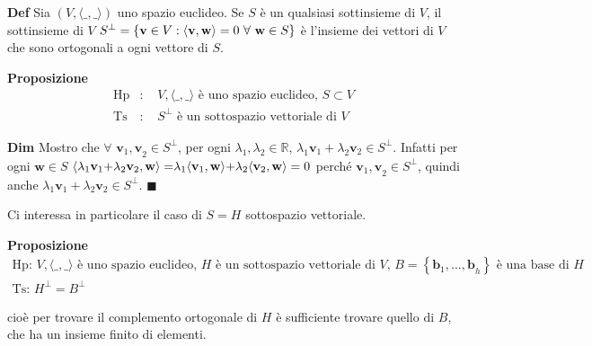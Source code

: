 \documentclass{article}
\begin{document}
\textbf{Def} Sia $\left( V,\langle \_,\_\mathbf{\rangle }\right) $ uno
spazio euclideo. Se $S$ \`{e} un qualsiasi sottinsieme di $V$, il
sottinsieme di $V$ $S^{\perp }=\left\{ \mathbf{v}\in V:\langle \mathbf{%
v,w\rangle }=0\text{ }\forall \text{ }\mathbf{w}\in S\right\} $ \`{e}
l'insieme dei vettori di $V$ che sono ortogonali a ogni vettore di $S$.

\textbf{Proposizione}%
\begin{eqnarray*}
\text{Hp} &\text{: }&V,\langle \_,\_\mathbf{\rangle }\text{ \`{e} uno spazio
euclideo, }S\subset V \\
\text{Ts} &\text{: }&S^{\perp }\text{ \`{e} un sottospazio vettoriale di }V
\end{eqnarray*}

\textbf{Dim} Mostro che $\forall $ $\mathbf{v}_{1}\mathbf{,v}_{2}\in
S^{\perp }$, per ogni $\lambda _{1},\lambda _{2}\in 
\mathbb{R}
$, $\lambda _{1}\mathbf{v}_{1}+\lambda _{2}\mathbf{v}_{2}\in S^{\perp }$.
Infatti per ogni $\mathbf{w}\in S$ $\langle \lambda _{1}\mathbf{v}_{1}%
\mathbf{+}\lambda _{2}\mathbf{v}_{2},\mathbf{w\rangle =}\lambda _{1}\langle 
\mathbf{v}_{1}\mathbf{,w\rangle +}\lambda _{2}\langle \mathbf{v}_{2}\mathbf{%
,w\rangle }=0$ perch\'{e} $\mathbf{v}_{1}\mathbf{,v}_{2}\in S^{\perp }$,
quindi anche $\lambda _{1}\mathbf{v}_{1}+\lambda _{2}\mathbf{v}_{2}\in
S^{\perp }$. $\blacksquare $

Ci interessa in particolare il caso di $S=H$ sottospazio vettoriale.

\textbf{Proposizione} 
\begin{gather*}
\text{Hp}\text{: }V,\langle \_,\_\mathbf{\rangle }\text{ \`{e} uno spazio
euclideo, }H\text{ \`{e} un sottospazio vettoriale di }V\text{, }B=\left\{ 
\mathbf{b}_{1}\mathbf{,...,b}_{h}\right\} \text{ \`{e} una base di }H \\
\text{Ts}\text{: }H^{\perp }=B^{\perp }
\end{gather*}

cio\`{e} per trovare il complemento ortogonale di $H$ \`{e} sufficiente
trovare quello di $B$, che ha un insieme finito di elementi.
\end{document}
